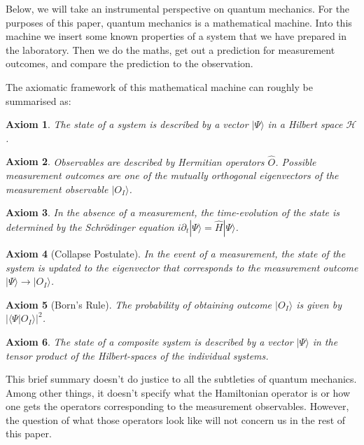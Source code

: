 \documentclass[superscriptaddress,floatfix,nofootinbib,12pt]{revtex4-2}
\newtheorem{axiom}{Axiom}
\begin{document}
Below, we will take an instrumental perspective on quantum mechanics. For the purposes of this paper, quantum mechanics is a mathematical machine. Into this machine we insert some known properties of a system that we have prepared in the laboratory. Then we do the maths, get out a prediction for measurement outcomes, and compare the prediction to the observation. 

The axiomatic framework of this mathematical machine can roughly be summarised as:
\begin{axiom}\label{A1}
    The state of a system is described by a vector $|\Psi\rangle$ in a Hilbert space $\mathscr{H}$.
\end{axiom}

\begin{axiom}\label{A2}
    Observables are described by Hermitian operators $\hat O$. Possible measurement outcomes are one of the mutually orthogonal eigenvectors of the measurement observable $|O_I\rangle$.
\end{axiom}
    
\begin{axiom}\label{A3}
    In the absence of a measurement, the time-evolution of the state is determined by the Schr\"odinger equation $i \partial_t |\Psi \rangle = \hat H |\Psi \rangle$.
\end{axiom}

\begin{axiom}[Collapse Postulate]\label{A4Collapse}
    In the event of a measurement, the state of the system is updated to the eigenvector that corresponds to the measurement outcome $|\Psi\rangle \to |O_I\rangle$.
\end{axiom}

\begin{axiom}[Born's Rule]\label{A5Born}
    The probability of obtaining outcome $|O_I\rangle$ is given by $|\langle \Psi | O_I \rangle|^2$. 
\end{axiom} 

\begin{axiom}\label{A6}
    The state of a composite system is described by a vector $|\Psi\rangle$ in the tensor product of the Hilbert-spaces of the individual systems.
\end{axiom}

This brief summary doesn't do justice to all the subtleties of quantum mechanics. Among other things, it doesn't specify what the Hamiltonian operator is or how one gets the operators corresponding to the measurement observables. However, the question of what those operators look like will not concern us in the rest of this paper. 
\end{document}
